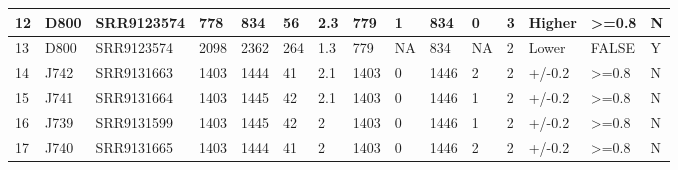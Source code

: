 \documentclass[a4paper]{paper}
\begin{document}
\begin{table}[htp]
\begin{tabular}{p{3cm}llllllllllllll}
\multicolumn{1}{|l|}{12} & \multicolumn{1}{l|}{D800} & \multicolumn{1}{l|}{SRR9123574} & \multicolumn{1}{l|}{778} & \multicolumn{1}{l|}{834} & \multicolumn{1}{l|}{56} & \multicolumn{1}{l|}{2.3} & \multicolumn{1}{l|}{779} & \multicolumn{1}{l|}{1} & \multicolumn{1}{l|}{834} & \multicolumn{1}{l|}{0} & \multicolumn{1}{l|}{3} & \multicolumn{1}{l|}{Higher} & \multicolumn{1}{l|}{\textgreater{}=0.8} & \multicolumn{1}{l|}{N} \\ \hline
\multicolumn{1}{|l|}{13} & \multicolumn{1}{l|}{D800} & \multicolumn{1}{l|}{SRR9123574} & \multicolumn{1}{l|}{2098} & \multicolumn{1}{l|}{2362} & \multicolumn{1}{l|}{264} & \multicolumn{1}{l|}{1.3} & \multicolumn{1}{l|}{779} & \multicolumn{1}{l|}{NA} & \multicolumn{1}{l|}{834} & \multicolumn{1}{l|}{NA} & \multicolumn{1}{l|}{2} & \multicolumn{1}{l|}{Lower} & \multicolumn{1}{l|}{FALSE} & \multicolumn{1}{l|}{Y} \\ \hline
\multicolumn{1}{|l|}{14} & \multicolumn{1}{l|}{J742} & \multicolumn{1}{l|}{SRR9131663} & \multicolumn{1}{l|}{1403} & \multicolumn{1}{l|}{1444} & \multicolumn{1}{l|}{41} & \multicolumn{1}{l|}{2.1} & \multicolumn{1}{l|}{1403} & \multicolumn{1}{l|}{0} & \multicolumn{1}{l|}{1446} & \multicolumn{1}{l|}{2} & \multicolumn{1}{l|}{2} & \multicolumn{1}{l|}{+/-0.2} & \multicolumn{1}{l|}{\textgreater{}=0.8} & \multicolumn{1}{l|}{N} \\ \hline
\multicolumn{1}{|l|}{15} & \multicolumn{1}{l|}{J741} & \multicolumn{1}{l|}{SRR9131664} & \multicolumn{1}{l|}{1403} & \multicolumn{1}{l|}{1445} & \multicolumn{1}{l|}{42} & \multicolumn{1}{l|}{2.1} & \multicolumn{1}{l|}{1403} & \multicolumn{1}{l|}{0} & \multicolumn{1}{l|}{1446} & \multicolumn{1}{l|}{1} & \multicolumn{1}{l|}{2} & \multicolumn{1}{l|}{+/-0.2} & \multicolumn{1}{l|}{\textgreater{}=0.8} & \multicolumn{1}{l|}{N} \\ \hline
\multicolumn{1}{|l|}{16} & \multicolumn{1}{l|}{J739} & \multicolumn{1}{l|}{SRR9131599} & \multicolumn{1}{l|}{1403} & \multicolumn{1}{l|}{1445} & \multicolumn{1}{l|}{42} & \multicolumn{1}{l|}{2} & \multicolumn{1}{l|}{1403} & \multicolumn{1}{l|}{0} & \multicolumn{1}{l|}{1446} & \multicolumn{1}{l|}{1} & \multicolumn{1}{l|}{2} & \multicolumn{1}{l|}{+/-0.2} & \multicolumn{1}{l|}{\textgreater{}=0.8} & \multicolumn{1}{l|}{N} \\ \hline
\multicolumn{1}{|l|}{17} & \multicolumn{1}{l|}{J740} & \multicolumn{1}{l|}{SRR9131665} & \multicolumn{1}{l|}{1403} & \multicolumn{1}{l|}{1444} & \multicolumn{1}{l|}{41} & \multicolumn{1}{l|}{2} & \multicolumn{1}{l|}{1403} & \multicolumn{1}{l|}{0} & \multicolumn{1}{l|}{1446} & \multicolumn{1}{l|}{2} & \multicolumn{1}{l|}{2} & \multicolumn{1}{l|}{+/-0.2} & \multicolumn{1}{l|}{\textgreater{}=0.8} & \multicolumn{1}{l|}{N} \\ \hline

\end{tabular}
\end{table}
\end{document}
